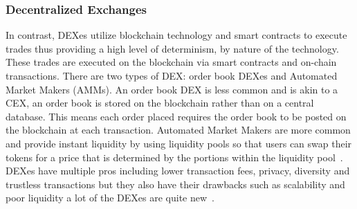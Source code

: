 \subsubsection{Decentralized Exchanges}
In contrast, DEXes utilize blockchain technology and smart contracts to execute trades thus providing a high level of determinism, by nature of the technology. These trades are executed on the blockchain via smart contracts and on-chain transactions. There are two types of DEX: order book DEXes and Automated Market Makers (AMMs). An order book DEX is less common and is akin to a CEX, an order book is stored on the blockchain rather than on a central database. This means each order placed requires the order book to be posted on the blockchain at each transaction. Automated Market Makers are more common and provide instant liquidity by using liquidity pools so that users can swap their tokens for a price that is determined by the portions within the liquidity pool~\cite{DEXes}. DEXes have multiple pros including lower transaction fees, privacy, diversity and trustless transactions but they also have their drawbacks such as scalability and poor liquidity a lot of the DEXes are quite new~\cite{DEXvsCEX}.


